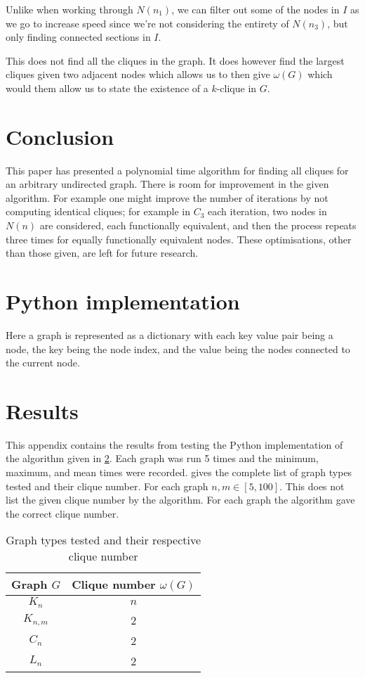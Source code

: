 \documentclass[11pt]{article}
\begin{document}
Unlike when working through $N(n_1)$, we can filter out some of the nodes in $I$ as we go to increase speed since we're not considering the entirety of $N(n_3)$, but only finding connected sections in $I$.

This does not find all the cliques in the graph. It does however find the largest cliques given two adjacent nodes which allows us to then give $\omega(G)$ which would them allow us to state the existence of a $k$-clique in $G$.

\section{Conclusion}

This paper has presented a polynomial time algorithm for finding all cliques for an arbitrary undirected graph. There is room for improvement in the given algorithm. For example one might improve the number of iterations by not computing identical cliques; for example in $C_3$ each iteration, two nodes in $N(n)$ are considered, each functionally equivalent, and then the process repeats three times for equally functionally equivalent nodes. These optimisations, other than those given, are left for future research.

\appendix
\section{Python implementation}
\label{apdx:a}
Here a graph is represented as a dictionary with each key value pair being a node, the key being the node index, and the value being the nodes connected to the current node.


\section{Results}
This appendix contains the results from testing the Python implementation of the algorithm given in \cref{apdx:a}. Each graph was run 5 times and the minimum, maximum, and mean times were recorded.  gives the complete list of graph types tested and their clique number. For each graph $n,m\in[5,100]$. This does not list the given clique number by the algorithm. For each graph the algorithm gave the correct clique number.

\begin{table}[h]
	\centering
	\begin{tabular}{c|c}
		Graph $G$ & Clique number $\omega(G)$\\\hline
		$K_n$ & $n$\\
		$K_{n,m}$ & 2\\
		$C_n$ & 2\\
		$L_n$ & 2\\
	\end{tabular}
	\caption{Graph types tested and their respective clique number}
	\label{tab:test-graphs}
\end{table}
\end{document}
